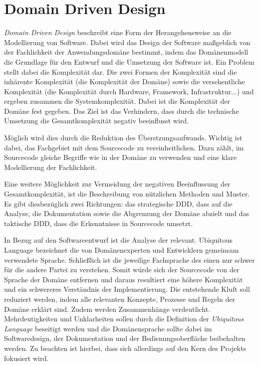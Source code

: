 \chapter{Domain Driven Design}
\textit{Domain Driven Design} beschreibt eine Form der Herangehensweise an die Modellierung von Software.
Dabei wird das Design der Software maßgeblich von der Fachlichkeit der Anwendungsdomäne bestimmt, indem das Domänenmodell die Grundlage für den Entwurf und die Umsetzung der Software ist.
Ein Problem stellt dabei die Komplexität dar.
Die zwei Formen der Komplexität sind die inhärente Komplexität (die Komplexität der Domäne) sowie die versehentliche Komplexität (die Komplexität durch Hardware, Framework, Infrastruktur...) und ergeben zusammen die Systemkomplexität.
Dabei ist die Komplexität der Domäne fest gegeben.
Das Ziel ist das Verhindern, dass durch die technische Umsetzung die Gesamtkomplexität negativ beeinflusst wird.

Möglich wird dies durch die Reduktion des Überstzungsaufwands.
Wichtig ist dabei, das Fachgebiet mit dem Sourcecode zu vereinheitlichen.
Dazu zählt, im Sourcecode gleiche Begriffe wie in der Domäne zu verwenden und eine klare Modellierung der Fachlichkeit.

Eine weitere Möglichkeit zur Vermeidung der negativen Beeinflussung der Gesamtkomplexität, ist die Beschreibung von nützlichen Methoden und Muster.
Es gibt diesbezüglich zwei Richtungen: das strategische \ac{DDD}, dass auf die Analyse, die Dokumentation sowie die Abgrenzung der Domäne abzielt und das taktische \ac{DDD}, dass die Erkenntnisse in Sourcecode umsetzt.

In Bezug auf den Softwareentwurf ist die Analyse der  relevant.
Ubiquitous Language bezeichnet die von Domänenexperten und Entwicklern gemeinsam verwendete Sprache.
Schließlich ist die jeweilige Fachsprache des einen nur schwer für die andere Partei zu verstehen.
Somit würde sich der Sourcecode von der Sprache der Domäne entfernen und daraus resultiert eine höhere Komplexität und ein schwereres Verständnis der Implementierung.
Die entstehende Kluft soll reduziert werden, indem alle relevanten Konzepte, Prozesse und Regeln der Domäne erklärt sind.
Zudem werden Zusammenhänge verdeutlicht.
Mehrdeutigkeiten und Unklarheiten sollen durch die Definition der \textit{Ubiquitous Language} beseitigt werden und die Domänensprache sollte dabei im Softwaredesign, der Dokumentation und der Bedienungsoberfläche beibehalten werden.
Zu beachten ist hierbei, dass sich allerdings auf den Kern des Projekts fokusiert wird.

